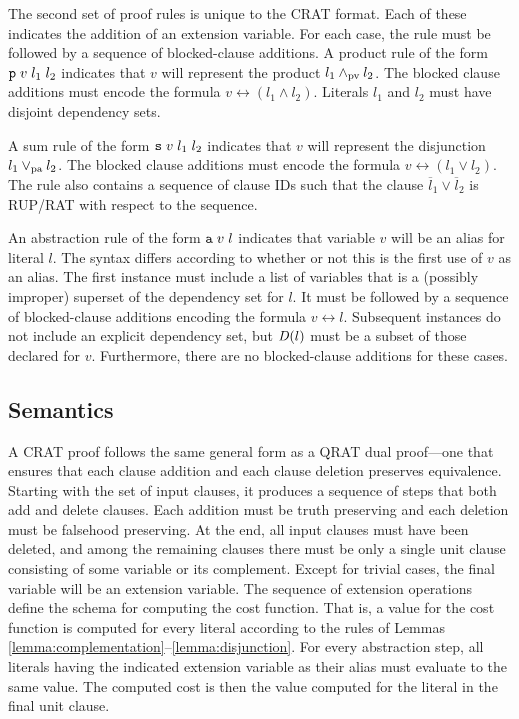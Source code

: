 \documentclass{llncs}
\newcommand{\pand}{\mathbin{\land_{\rm pv}}}
\newcommand{\por}{\mathbin{\lor_{\rm pa}}}
\newcommand{\obar}[1]{\overline{#1}}
\newcommand{\depend}{{\it D}}
\begin{document}
The second set of proof rules is unique to the CRAT format.  Each of
these indicates the addition of an extension variable.  For each case,
the rule must be followed by a sequence of blocked-clause additions.
A product rule of the form ${\tt p}\;v\;l_1\;l_2$ indicates that $v$
will represent the product $l_1 \pand l_2$.  The blocked clause
additions must encode the formula $v \leftrightarrow (l_1 \land l_2)$.
Literals $l_1$ and $l_2$ must have disjoint dependency sets.

A sum rule of the form ${\tt s}\;v\;l_1\;l_2$ indicates that $v$ will
represent the disjunction $l_1 \por l_2$.  The blocked clause
additions must encode the formula $v \leftrightarrow (l_1 \lor l_2)$.
The rule also contains a sequence of clause IDs such that the clause
$\obar{l}_1 \lor \obar{l}_2$ is RUP/RAT with respect to the sequence.

An abstraction rule of the form ${\tt a}\;v\;l$ indicates that
variable $v$ will be an alias for literal $l$.  The syntax differs
according to whether or not this is the first use of $v$ as an
alias.  The first instance must include a list of variables that is a
(possibly improper) superset of the dependency set for $l$.  It must
be followed by a sequence of blocked-clause additions encoding the
formula $v \leftrightarrow l$.  Subsequent instances do not
include an explicit dependency set, but $\depend(l)$ must be a subset of
those declared for $v$.  Furthermore, there are no blocked-clause
additions for these cases.


\subsection{Semantics}

A CRAT proof follows the same general form as a QRAT dual proof---one
that ensures that each clause addition and each clause deletion preserves
equivalence.  Starting with the set of input clauses, it produces a
sequence of steps that both add and delete clauses.  Each addition
must be truth preserving and each deletion must be falsehood
preserving.  At the end, all input clauses must have been deleted, and
among the remaining clauses there must be only a single unit clause consisting of some variable or
its complement.  Except for trivial cases, the final variable will be
an extension variable.  The sequence of extension operations define
the schema for computing the cost function.  That is, a value for the
cost function is computed for every literal according to the rules of
Lemmas \ref{lemma:complementation}--\ref{lemma:disjunction}.  For
every abstraction step, all literals having the indicated extension
variable as their alias must evaluate to the same value.  The computed
cost is then the value computed for the literal in the final unit
clause.
\end{document}
